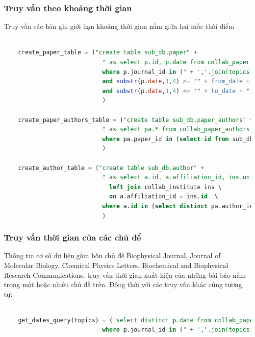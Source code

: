 \documentclass{article}
\begin{document}
\subsubsection{Truy vấn theo khoảng thời gian}

\indent Truy vấn các bản ghi giới hạn khoảng thời gian nằm giữa hai mốc thời điểm

\begin{lstlisting}[language=SQL, caption=Truy vấn theo lát cắt thời gian: khoảng cắt]

	create_paper_table = ("create table sub_db.paper" +  
                            " as select p.id, p.date from collab_paper p \
                            where p.journal_id in (" + ','.join(topics) + ") \
                            and substr(p.date,1,4) >= '" + from_date + "' \
                            and substr(p.date,1,4) <= '" + to_date + "'"
                            )

	create_paper_authors_table = ("create table sub_db.paper_authors" +  
                            " as select pa.* from collab_paper_authors pa \
                            where pa.paper_id in (select id from sub_db.paper)"
                            )

	create_author_table = ("create table sub_db.author" +  
                            " as select a.id, a.affiliation_id, ins.university, a.country_id from collab_author a \
                              left join collab_institute ins \
                              on a.affiliation_id = ins.id  \
                            where a.id in (select distinct pa.author_id from sub_db.paper_authors pa)"
                            )       


\end{lstlisting}

\subsubsection{Truy vấn thời gian của các chủ để}

\indent Thông tin cơ sở dữ liệu gồm bốn chủ đề Biophysical Journal, Journal of Molecular Biology, Chemical Physics Letters, Biochemical and Biophysical Research Communications, truy vấn thời gian xuất hiện của những bài báo nằm trong một hoặc nhiều chủ đề trên. Đồng thời với các truy vấn khác cũng tương tự:

\begin{lstlisting}[language=SQL, caption=Truy vấn thời gian của các chủ đề]

	get_dates_query(topics) = ("select distinct p.date from collab_paper p \
                            where p.journal_id in (" + ','.join(topics) + ")")


\end{lstlisting}
\end{document}
